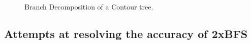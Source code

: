 \begin{figure}[h]
    \qquad
    \caption{Branch Decomposition of a Contour tree.}%
    \label{fig:path-cases}%
\end{figure}



\subsection{Attempts at resolving the accuracy of 2xBFS}




